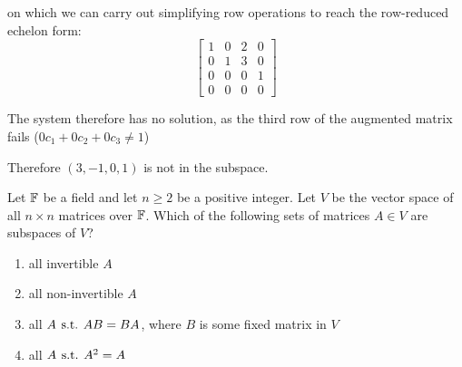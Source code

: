 \documentclass[a4paper, 11pt]{article}
\begin{document}
\begin{solution}
    on which we can carry out simplifying row operations to reach the row-reduced echelon form:
    \[
        \left[\begin{array}{ccc|c}
                1 & 0 & 2 & 0 \\
                0 & 1 & 3 & 0 \\
                0 & 0 & 0 & 1 \\
                0 & 0 & 0 & 0
            \end{array}\right]
    \]

    The system therefore has no solution, as the third row of the augmented matrix fails (\(0c_1 + 0c_2 + 0c_3 \neq 1\))

    Therefore \((3, -1, 0, 1)\) is not in the subspace.
\end{solution}

\begin{problem} 
Let \(\mathbb{F}\) be a field and let \(n \geq 2\) be a positive integer. Let \(V\) be the vector space of all \(n \times n\) matrices over \(\mathbb{F}\). Which of the following sets of matrices \(A \in V\) are subspaces of \(V\)?
\begin{enumerate}
    \item all invertible \(A\)
    \item all non-invertible \(A\)
    \item all \(A \hspace*{4pt}\text{s.t.}\hspace*{4pt} AB = BA\), where \(B\) is some fixed matrix in \(V\)
    \item all \(A \hspace*{4pt}\text{s.t.}\hspace*{4pt} A^2 = A\)
\end{enumerate}
\end{problem}
\end{document}
